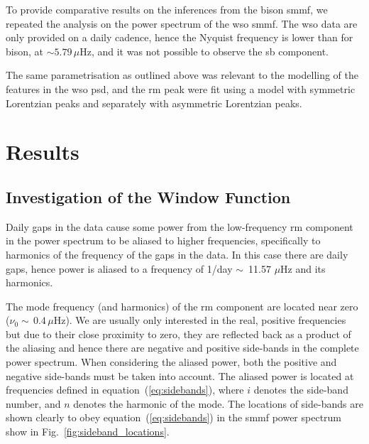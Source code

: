 To provide comparative results on the inferences from the \gls{bison} \gls{smmf}, we repeated the analysis on the power spectrum of the \gls{wso} \gls{smmf}. The \gls{wso} data are only provided on a daily cadence, hence the Nyquist frequency is lower than for \gls{bison}, at $\sim 5.79 \, \mu\mathrm{Hz}$, and it was not possible to observe the \gls{sb} component.

The same parametrisation as outlined above was relevant to the modelling of the features in the \gls{wso} \gls{psd}, and the \gls{rm} peak were fit using a model with symmetric Lorentzian peaks and separately with asymmetric Lorentzian peaks.


\section{Results}\label{sec:SMMF_reults}

\subsection{Investigation of the Window Function}\label{sec:window_fn}


Daily gaps in the data cause some power from the low-frequency \gls{rm} component in the power spectrum to be aliased to higher frequencies, specifically to harmonics of the frequency of the gaps in the data. In this case there are daily gaps, hence power is aliased to a frequency of 1/day $\sim$~11.57 $\mu$Hz and its harmonics.

The mode frequency (and harmonics) of the \gls{rm} component are located near zero ($\nu_0 \sim \,0.4 \, \mu\mathrm{Hz}$). We are usually only interested in the real, positive frequencies but due to their close proximity to zero, they are reflected back as a product of the aliasing and hence there are negative and positive side-bands in the complete power spectrum. When considering the aliased power, both the positive and negative side-bands must be taken into account. The aliased power is located at frequencies defined in equation~(\ref{eq:sidebands}), where $i$ denotes the side-band number, and $n$ denotes the harmonic of the mode. The locations of side-bands are shown clearly to obey equation~(\ref{eq:sidebands}) in the \gls{smmf} power spectrum show in Fig.~\ref{fig:sideband_locations}.


